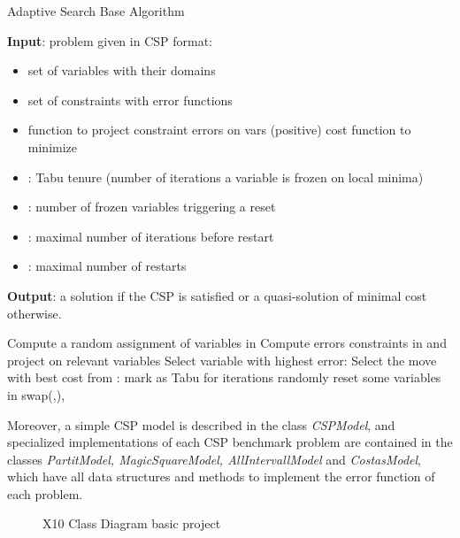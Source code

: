 \documentclass{llncs}
\newcommand{\BL}{\vspace{\baselineskip}}
\begin{document}
\begin{algorithm}[H]
   \caption{Adaptive Search Base Algorithm}
   \label{fig:as-algo}
\BL
{\textbf{Input}: problem given in CSP format:}

\begin{itemize}
\item  set of variables  with their domains
\item  set of constraints  with error functions
\item  function to project constraint errors on vars (positive) cost function to minimize
\item  : Tabu tenure (number of iterations a variable is frozen on local minima)
\item  : number of frozen variables triggering a reset
\item  : maximal number of iterations before restart
\item  : maximal number of restarts
\end{itemize}

{\textbf{Output}}: a solution if the CSP is satisfied or a quasi-solution of minimal cost otherwise.

     \BL


   \begin{algorithmic}[1]
     \State 
     \Repeat
       \State 
       \State 
       \State Compute a random assignment  of variables in 
       \State 
       \State 
       \Repeat
         \State 
         \State Compute errors constraints in  and project on relevant variables
         \State Select variable  with highest error: 
         \State {}
         \State Select the move with best cost from :  
           \State mark  as Tabu for  iterations
             \State randomly reset some variables in 
              \State {}
           \EndIf
         \Else
           \State swap(,),
           \State {}
           \If{}
             \State 
             \State 
           \EndIf
         \EndIf
     \State 
   \end{algorithmic}
 \end{algorithm}

Moreover,
a simple CSP model is described in the class \emph{CSPModel}, and
specialized implementations of each CSP benchmark problem are
contained in the classes \emph{PartitModel, MagicSquareModel,
  AllIntervallModel} and \emph{CostasModel}, which have all data
structures and methods to implement the error function of each
problem.
\begin{figure}[htb]
\centerline{} 
\caption{X10 Class Diagram basic project}\label{fig:ClassDiagramX10}
\end{figure}
\end{document}
